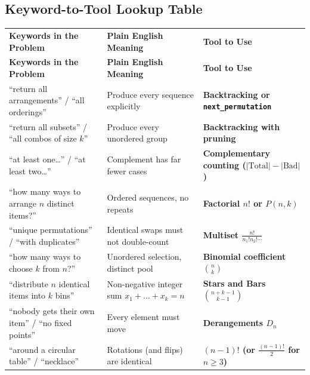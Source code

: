 \documentclass[11pt,a4paper]{article}
\theoremstyle{definition}
\begin{document}
\subsection*{Keyword-to-Tool Lookup Table}

\begingroup\small{}
\begin{xltabular}{\textwidth}{>{\raggedright\arraybackslash}p{4.4cm} >{\raggedright\arraybackslash}X >{\raggedright\arraybackslash\bfseries}p{4.1cm}}
\toprule[1.2pt]
\textcolor{primaryblue}{\textbf{Keywords in the Problem}} & \textcolor{primaryblue}{\textbf{Plain English Meaning}} & \textcolor{primaryblue}{\textbf{Tool to Use}} \\
\midrule[0.6pt]
\endfirsthead
{}\toprule[1.2pt]
\textcolor{primaryblue}{\textbf{Keywords in the Problem}} & \textcolor{primaryblue}{\textbf{Plain English Meaning}} & \textcolor{primaryblue}{\textbf{Tool to Use}} \\
\midrule[0.6pt]
\endhead
{}\bottomrule[1.2pt]
\endfoot
``return all arrangements'' / ``all orderings'' & Produce every sequence explicitly & Backtracking or \texttt{next\_permutation} \\
``return all subsets'' / ``all combos of size $k$'' & Produce every unordered group & Backtracking with pruning \\
``at least one\dots'' / ``at least two\dots'' & Complement has far fewer cases & Complementary counting ($|\text{Total}| - |\text{Bad}|$) \\
``how many ways to arrange $n$ distinct items?'' & Ordered sequences, no repeats & Factorial $n!$ or $P(n, k)$ \\
``unique permutations'' / ``with duplicates'' & Identical swaps must not double-count & Multiset $\frac{n!}{n_1! n_2! \cdots}$ \\
``how many ways to choose $k$ from $n$?'' & Unordered selection, distinct pool & Binomial coefficient $\binom{n}{k}$ \\
``distribute $n$ identical items into $k$ bins'' & Non-negative integer sum $x_1+\dots+x_k=n$ & Stars and Bars $\binom{n+k-1}{k-1}$ \\
``nobody gets their own item'' / ``no fixed points'' & Every element must move & Derangements $D_n$ \\
``around a circular table'' / ``necklace'' & Rotations (and flips) are identical & $(n-1)!$ (or $\frac{(n-1)!}{2}$ for $n \ge 3$) \\

\end{xltabular}
\end{document}
